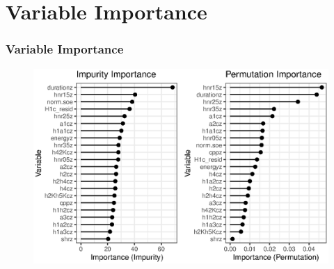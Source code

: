\documentclass{beamer}
\begin{document}
\section{Variable Importance}
\begin{frame}
  \frametitle{Variable Importance}
  \begin{figure}[h!]
    \centering
    \includegraphics[width = 0.8\linewidth]{images/RandomForest/rf_dur_plots.eps}
  \end{figure}
\end{frame}
\end{document}
